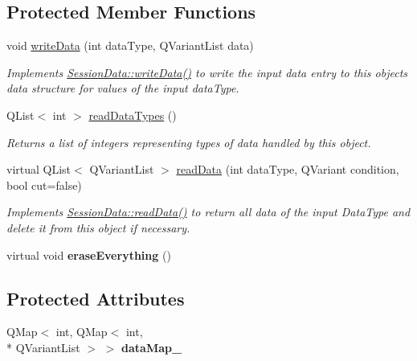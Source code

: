 \subsection*{Protected Member Functions}
\begin{DoxyCompactItemize}
\item 
void \hyperlink{class_cached_session_data_a117bf457f1ec414ecb238ae9c60d35d4}{write\-Data} (int data\-Type, Q\-Variant\-List data)
\begin{DoxyCompactList}\small\item\em Implements \hyperlink{class_session_data_ad05a594d8410d638f1a066bfa5a10ba3}{Session\-Data\-::write\-Data()} to write the input data entry to this objects data structure for values of the input data\-Type. \end{DoxyCompactList}\item 
Q\-List$<$ int $>$ \hyperlink{class_cached_session_data_aa63a22afd537fbaccbf68dee67981018}{read\-Data\-Types} ()
\begin{DoxyCompactList}\small\item\em Returns a list of integers representing types of data handled by this object. \end{DoxyCompactList}\item 
virtual Q\-List$<$ Q\-Variant\-List $>$ \hyperlink{class_cached_session_data_a772e4f41e01333a090f3e683e4f4e18f}{read\-Data} (int data\-Type, Q\-Variant condition, bool cut=false)
\begin{DoxyCompactList}\small\item\em Implements \hyperlink{class_session_data_a81f4eb49b8a23eb9c1a1575abc2fad4c}{Session\-Data\-::read\-Data()} to return all data of the input Data\-Type and delete it from this object if necessary. \end{DoxyCompactList}\item 
\hypertarget{class_cached_session_data_a6b9dc44ecbcacd2dce36bdb5ed0b10df}{virtual void {\bfseries erase\-Everything} ()}\label{class_cached_session_data_a6b9dc44ecbcacd2dce36bdb5ed0b10df}

\end{DoxyCompactItemize}
\subsection*{Protected Attributes}
\begin{DoxyCompactItemize}
\item 
\hypertarget{class_cached_session_data_aa3acc675e891edcf9dc79b2b5cb7d7b5}{Q\-Map$<$ int, Q\-Map$<$ int, \\*
Q\-Variant\-List $>$ $>$ {\bfseries data\-Map\-\_\-}}\label{class_cached_session_data_aa3acc675e891edcf9dc79b2b5cb7d7b5}

\end{DoxyCompactItemize}


